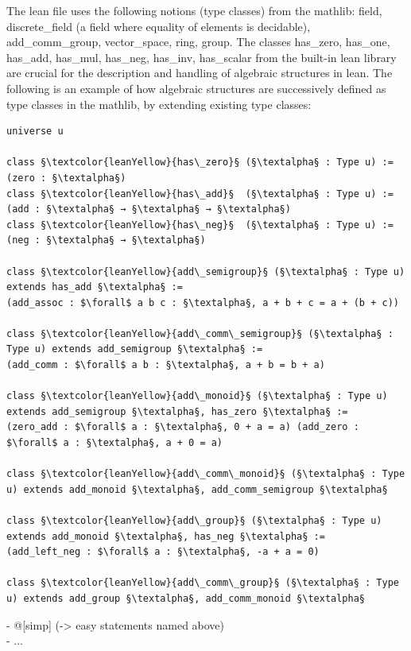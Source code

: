 \documentclass[11pt]{article}
\begin{document}
The lean file uses the following notions (type classes) from the mathlib: {\lean field}, {\lean discrete\_field} (a field where equality of elements is decidable), {\lean add\_comm\_group}, {\lean vector\_space}, {\lean ring}, {\lean group}.
The classes {\lean has\_zero}, {\lean has\_one}, {\lean has\_add}, {\lean has\_mul}, {\lean has\_neg}, {\lean has\_inv}, {\lean has\_scalar} from the built-in lean library are crucial for the description and handling of algebraic structures in lean.
The following is an example of how algebraic structures are successively defined as type classes in the mathlib, by extending existing type classes:
\begin{lstlisting}
universe u

class §\textcolor{leanYellow}{has\_zero}§ (§\textalpha§ : Type u) := (zero : §\textalpha§)
class §\textcolor{leanYellow}{has\_add}§  (§\textalpha§ : Type u) := (add : §\textalpha§ → §\textalpha§ → §\textalpha§)
class §\textcolor{leanYellow}{has\_neg}§  (§\textalpha§ : Type u) := (neg : §\textalpha§ → §\textalpha§)

class §\textcolor{leanYellow}{add\_semigroup}§ (§\textalpha§ : Type u) extends has_add §\textalpha§ :=
(add_assoc : $\forall$ a b c : §\textalpha§, a + b + c = a + (b + c))

class §\textcolor{leanYellow}{add\_comm\_semigroup}§ (§\textalpha§ : Type u) extends add_semigroup §\textalpha§ :=
(add_comm : $\forall$ a b : §\textalpha§, a + b = b + a)

class §\textcolor{leanYellow}{add\_monoid}§ (§\textalpha§ : Type u) extends add_semigroup §\textalpha§, has_zero §\textalpha§ :=
(zero_add : $\forall$ a : §\textalpha§, 0 + a = a) (add_zero : $\forall$ a : §\textalpha§, a + 0 = a)

class §\textcolor{leanYellow}{add\_comm\_monoid}§ (§\textalpha§ : Type u) extends add_monoid §\textalpha§, add_comm_semigroup §\textalpha§

class §\textcolor{leanYellow}{add\_group}§ (§\textalpha§ : Type u) extends add_monoid §\textalpha§, has_neg §\textalpha§ :=
(add_left_neg : $\forall$ a : §\textalpha§, -a + a = 0)

class §\textcolor{leanYellow}{add\_comm\_group}§ (§\textalpha§ : Type u) extends add_group §\textalpha§, add_comm_monoid §\textalpha§
\end{lstlisting}


- @[simp] (-> easy statements named above)\\
- ...
\end{document}
